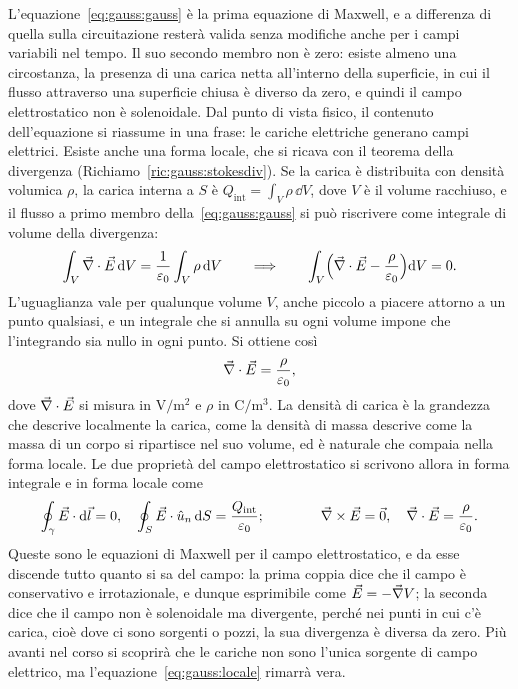 \documentclass[11pt,a4paper]{article}
\begin{document}
L'equazione~\eqref{eq:gauss:gauss} è la prima equazione di Maxwell, e a differenza di quella sulla circuitazione resterà valida senza modifiche anche per i campi variabili nel tempo. Il suo secondo membro non è zero: esiste almeno una circostanza, la presenza di una carica netta all'interno della superficie, in cui il flusso attraverso una superficie chiusa è diverso da zero, e quindi il campo elettrostatico non è solenoidale. Dal punto di vista fisico, il contenuto dell'equazione si riassume in una frase: le cariche elettriche generano campi elettrici. Esiste anche una forma locale, che si ricava con il teorema della divergenza (Richiamo~\ref{ric:gauss:stokesdiv}). Se la carica è distribuita con densità volumica $\rho$, la carica interna a $S$ è $Q_{\mathrm{int}}=\int_V\rho\,\dd V$, dove $V$ è il volume racchiuso, e il flusso a primo membro della~\eqref{eq:gauss:gauss} si può riscrivere come integrale di volume della divergenza:
\[
\int_V\vec{\nabla}\cdot\vec{E}\,\mathrm{d} V=\frac{1}{\varepsilon_0}\int_V\rho\,\mathrm{d} V
\qquad\Longrightarrow\qquad
\int_V\Bigl(\vec{\nabla}\cdot\vec{E}-\frac{\rho}{\varepsilon_0}\Bigr)\mathrm{d} V=0 .
\]
L'uguaglianza vale per qualunque volume $V$, anche piccolo a piacere attorno a un punto qualsiasi, e un integrale che si annulla su ogni volume impone che l'integrando sia nullo in ogni punto. Si ottiene così
\begin{equation}
\vec{\nabla}\cdot\vec{E}=\frac{\rho}{\varepsilon_0},
\label{eq:gauss:locale}
\end{equation}
dove $\vec{\nabla}\cdot\vec{E}$ si misura in $\mathrm{V/m^2}$ e $\rho$ in $\mathrm{C/m^3}$. La densità di carica è la grandezza che descrive localmente la carica, come la densità di massa descrive come la massa di un corpo si ripartisce nel suo volume, ed è naturale che compaia nella forma locale. Le due proprietà del campo elettrostatico si scrivono allora in forma integrale e in forma locale come
\[
\oint_\gamma\vec{E}\cdot\mathrm{d}\vec{l}=0,\quad \oint_S\vec{E}\cdot\hat{u}_n\,\mathrm{d} S=\frac{Q_{\mathrm{int}}}{\varepsilon_0};
\qquad\qquad
\vec{\nabla}\times\vec{E}=\vec{0},\quad \vec{\nabla}\cdot\vec{E}=\frac{\rho}{\varepsilon_0}.
\]
Queste sono le equazioni di Maxwell per il campo elettrostatico, e da esse discende tutto quanto si sa del campo: la prima coppia dice che il campo è conservativo e irrotazionale, e dunque esprimibile come $\vec{E}=-\vec{\nabla} V$; la seconda dice che il campo non è solenoidale ma divergente, perché nei punti in cui c'è carica, cioè dove ci sono sorgenti o pozzi, la sua divergenza è diversa da zero. Più avanti nel corso si scoprirà che le cariche non sono l'unica sorgente di campo elettrico, ma l'equazione~\eqref{eq:gauss:locale} rimarrà vera.
\end{document}
